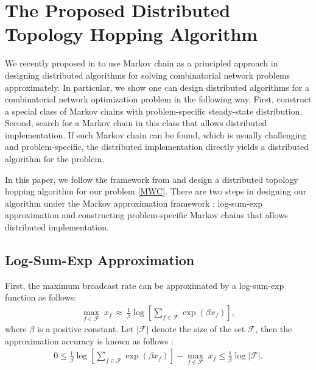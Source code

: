 \documentclass[10pt,conference]{IEEEtran}
\begin{document}
\section{The Proposed Distributed Topology Hopping Algorithm}

\label{sec:maf}

We recently proposed in \cite{MA:CLSC10} to use Markov chain as a principled approach in designing distributed algorithms for solving combinatorial network problems approximately. In particular, we show one can design distributed algorithms for a combinatorial network optimization problem in the following way. First, construct a special class of Markov chains with problem-specific steady-state distribution. Second, search for a Markov chain in this class that allows distributed implementation. If such Markov chain can be found, which is usually challenging and problem-specific, the distributed implementation directly yields a distributed algorithm for the problem.

In this paper, we follow the framework from \cite{MA:CLSC10} and design a distributed topology hopping algorithm for our problem \eqref{MWC}. There are two steps in designing
our algorithm under the Markov approximation framework \cite{MA:CLSC10}:
log-sum-exp approximation and constructing problem-specific Markov chains that allows distributed implementation.

\begin{comment}
The idea behind our design is to let the P2P system adapt peer configurations
to pursue good-performance topologies and stay in them for majority
of the time.
\end{comment}
{}


\subsection{Log-Sum-Exp Approximation}

First, the maximum broadcast rate can be approximated by a log-sum-exp
function as follows: \begin{align}
\max_{f\in\mathcal{F}}\; x_{f}\,\approx\,\frac{1}{\beta}\log\left[\sum_{f\in\mathcal{F}}\exp\left(\beta x_{f}\right)\right],\label{appro1}\end{align}
 where $\beta$ is a positive constant. Let $|\mathcal{F}|$ denote
the size of the set $\mathcal{F}$, then the approximation accuracy
is known as follows \cite{MA:CLSC10}: \begin{align}
0\le\frac{1}{\beta}\log\left[\sum_{f\in\mathcal{F}}\exp\left(\beta x_{f}\right)\right]-\max_{f\in\mathcal{F}}\; x_{f}\le\frac{1}{\beta}\log|\mathcal{F}|.\label{aa1}\end{align}
\end{document}
